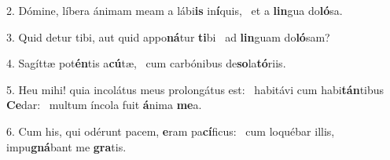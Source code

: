 2. Dómine, líbera ánimam meam a lábi\textbf{is} in\textbf{í}quis, \ast\  et a \textbf{lin}gua do\textbf{ló}sa.\

3. Quid detur tibi, aut quid appo\textbf{ná}tur \textbf{ti}bi \ast\  ad \textbf{lin}guam do\textbf{ló}sam?\

4. Sagíttæ pot\textbf{én}tis a\textbf{cú}tæ, \ast\  cum carbónibus de\textbf{so}la\textbf{tó}riis.\

5. Heu mihi! quia incolátus meus prolongátus est: \dag\  habitávi cum habi\textbf{tán}tibus \textbf{Ce}dar: \ast\  multum íncola fuit \textbf{á}nima \textbf{me}a.\

6. Cum his, qui odérunt pacem, \textbf{e}ram pa\textbf{cí}ficus: \ast\  cum loquébar illis, impu\textbf{gná}bant me \textbf{gra}tis.\

